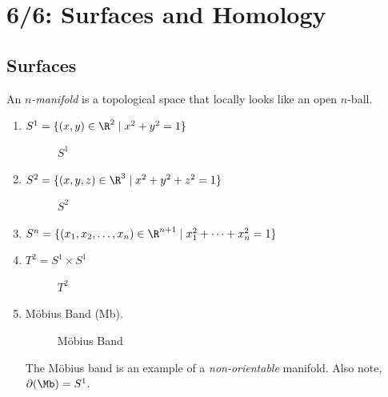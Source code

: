 \chapter*{6/6: Surfaces and Homology}

\section{Surfaces}

\begin{definition}[$n$-Manifold]
	 An \textit{$n$-manifold} is a topological space that locally looks like an open $n$-ball.
\end{definition}

\begin{example}
	\begin{enumerate}
		\item $S^1 = \{(x,y) \in \R^2 \mid x^2 + y^2 = 1\}$
        \begin{figure}[H]
            \centering
            \caption{$S^1$}
            \label{fig:s1}
        \end{figure}
        \item $S^2 = \{(x,y,z) \in \R^3 \mid x^2 + y^2 + z^2 = 1\}$
        \begin{figure}[H]
            \centering
            \caption{$S^2$}
            \label{fig:s2}
        \end{figure}
        \item $S^n = \{(x_1,x_2,\dots,x_n) \in \R^{n + 1} \mid x_1^2 + \dots + x_n^2 = 1\}$
        \item $T^2 = S^1 \times S^1$
        \begin{figure}[H]
            \centering
            \caption{$T^2$}
            \label{fig:t2}
        \end{figure}
        \item M\"obius Band (Mb).
        \begin{figure}[H]
            \centering
            \caption{M\"obius Band}
            \label{fig:mobius-band}
        \end{figure}
        The M\"obius band is an example of a \textit{non-orientable} manifold. Also note, $\partial(\Mb) = S^1$. 
	\end{enumerate}
\end{example}

